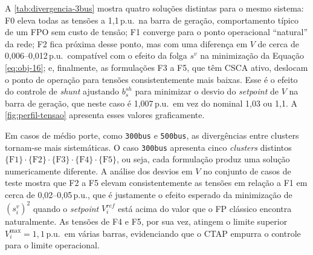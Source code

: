 A \autoref{tab:divergencia-3bus} mostra quatro soluções distintas para o mesmo sistema: F0 eleva todas as tensões a 1,1\,p.u.\ na barra de geração, comportamento típico de um FPO sem custo de tensão; F1 converge para o ponto operacional ``natural'' da rede; F2 fica próxima desse ponto, mas com uma diferença em $V$ de cerca de 0,006--0,012\,p.u.\ compatível com o efeito da folga $s^v$ na minimização da Equação \eqref{eq:obj-16}; e, finalmente, as formulações F3 a F5, que têm CSCA ativo, deslocam o ponto de operação para tensões consistentemente mais baixas. Esse é o efeito do controle de \textit{shunt} ajustando $b^{sh}_s$ para minimizar o desvio do \textit{setpoint} de $V$ na barra de geração, que neste caso é 1,007\,p.u.\ em vez do nominal 1,03 ou 1,1. A \autoref{fig:perfil-tensao} apresenta esses valores graficamente.

\begin{figure}[!htb]
\end{figure}

Em casos de médio porte, como \texttt{300bus} e \texttt{500bus}, as divergências entre clusters tornam-se mais sistemáticas. O caso \texttt{300bus} apresenta cinco \textit{clusters} distintos $\{\text{F1}\}\cdot\{\text{F2}\}\cdot\{\text{F3}\}\cdot\{\text{F4}\}\cdot\{\text{F5}\}$, ou seja, cada formulação produz uma solução numericamente diferente. A análise dos desvios em $V$ no conjunto de casos de teste mostra que F2 a F5 elevam consistentemente as tensões em relação a F1 em cerca de 0,02--0,05\,p.u., que é justamente o efeito esperado da minimização de $(s^v_i)^2$ quando o \textit{setpoint} $V^{ref}_i$ está acima do valor que o FP clássico encontra naturalmente. As tensões de F4 e F5, por sua vez, atingem o limite superior $V^{\max}_i = 1{,}1$\,p.u.\ em várias barras, evidenciando que o CTAP empurra o controle para o limite operacional.

